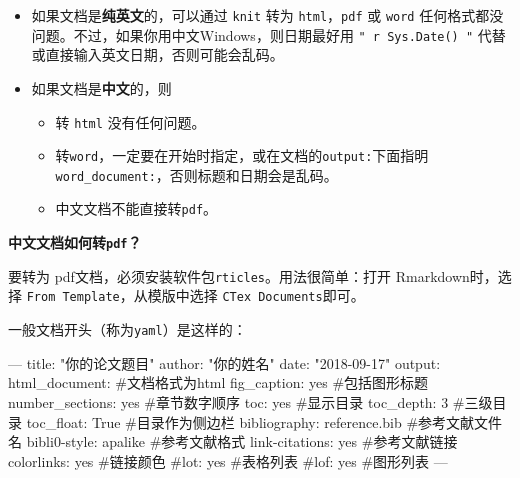 \documentclass[]{article}
\newenvironment{Shaded}{\begin{snugshade}}{\end{snugshade}}
\newcommand{\BaseNTok}[1]{\textcolor[rgb]{0.00,0.00,0.81}{#1}}
\newcommand{\NormalTok}[1]{#1}
\providecommand{\tightlist}{%
  \setlength{\itemsep}{0pt}\setlength{\parskip}{0pt}}
\begin{document}
\begin{itemize}
\tightlist
\item
  如果文档是\textbf{纯英文}的，可以通过 \texttt{knit} 转为
  \texttt{html}，\texttt{pdf} 或 \texttt{word}
  任何格式都没问题。不过，如果你用中文Windows，则日期最好用
  \texttt{"\textasciigrave{}\ r\ Sys.Date()\ \textasciigrave{}"}
  代替或直接输入英文日期，否则可能会乱码。
\item
  如果文档是\textbf{中文}的，则

  \begin{itemize}
  \tightlist
  \item
    转 \texttt{html} 没有任何问题。
  \item
    转\texttt{word}，一定要在开始时指定，或在文档的\texttt{output:}下面指明\texttt{word\_document:}，否则标题和日期会是乱码。
  \item
    中文文档不能直接转\texttt{pdf}。
  \end{itemize}
\end{itemize}

\textbf{中文文档如何转\texttt{pdf}？}

要转为 pdf文档，必须安装软件包\texttt{rticles}。用法很简单：打开
Rmarkdown时，选择 \texttt{From\ Template}，从模版中选择
\texttt{CTex\ Documents}即可。

一般文档开头（称为\texttt{yaml}）是这样的：

\begin{Shaded}
\begin{Highlighting}[]
\NormalTok{---}
\NormalTok{title: "你的论文题目"}
\NormalTok{author: "你的姓名"}
\NormalTok{date:  "2018-09-17"}
\NormalTok{output: }
\NormalTok{  html_document:                           #文档格式为html}
\BaseNTok{    fig_caption: yes                       #包括图形标题}
\BaseNTok{    number_sections: yes                   #章节数字顺序}
\BaseNTok{    toc: yes                               #显示目录}
\BaseNTok{    toc_depth: 3                           #三级目录}
\BaseNTok{    toc_float: True                        #目录作为侧边栏}
\NormalTok{bibliography: reference.bib                #参考文献文件名}
\NormalTok{bibli0-style: apalike                      #参考文献格式}
\NormalTok{link-citations: yes                        #参考文献链接}
\NormalTok{colorlinks: yes                            #链接颜色}
\NormalTok{#lot: yes                                  #表格列表}
\NormalTok{#lof: yes                                  #图形列表}
\NormalTok{---}
\end{Highlighting}
\end{Shaded}
\end{document}
